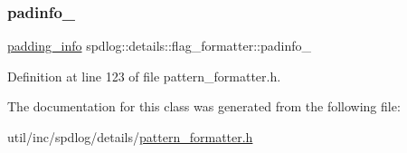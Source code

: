 \subsubsection{\texorpdfstring{padinfo\+\_\+}{padinfo\_}}
{\footnotesize\ttfamily \hyperlink{structspdlog_1_1details_1_1padding__info}{padding\+\_\+info} spdlog\+::details\+::flag\+\_\+formatter\+::padinfo\+\_\+\hspace{0.3cm}{\ttfamily [protected]}}



Definition at line 123 of file pattern\+\_\+formatter.\+h.



The documentation for this class was generated from the following file\+:\begin{DoxyCompactItemize}
\item 
util/inc/spdlog/details/\hyperlink{pattern__formatter_8h}{pattern\+\_\+formatter.\+h}\end{DoxyCompactItemize}
